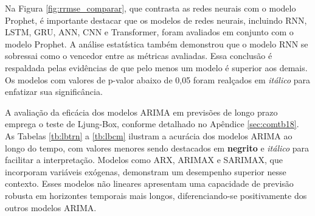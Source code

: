 Na Figura \ref{fig:rrmse_comparar}, que contrasta as redes neurais com o modelo Prophet, é importante destacar que os modelos de redes neurais, incluindo RNN, LSTM, GRU, ANN, CNN e Transformer, foram avaliados em conjunto com o modelo Prophet. A análise estatística também demonstrou que o modelo RNN se sobressai como o vencedor entre as métricas avaliadas. Essa conclusão é respaldada pelas evidências de que pelo menos um modelo é superior aos demais. Os modelos com valores de p-valor abaixo de 0,05 foram realçados em \textit{itálico} para enfatizar sua significância.

A avaliação da eficácia dos modelos ARIMA em previsões de longo prazo emprega o teste de Ljung-Box, conforme detalhado no Apêndice \ref{sec:comtb18}. As Tabelas \ref{tb:lbtrn} a \ref{tb:lbcm} ilustram a acurácia dos modelos ARIMA ao longo do tempo, com valores menores sendo destacados em \textbf{negrito} e \textit{itálico} para facilitar a interpretação. Modelos como ARX, ARIMAX e SARIMAX, que incorporam variáveis exógenas, demonstram um desempenho superior nesse contexto. Esses modelos não lineares apresentam uma capacidade de previsão robusta em horizontes temporais mais longos, diferenciando-se positivamente dos outros modelos ARIMA.
